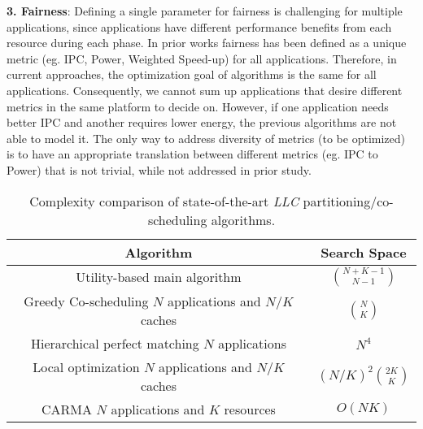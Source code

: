 \indent \textbf{3. Fairness}: Defining a single parameter for fairness is challenging for multiple applications, since applications have different performance benefits from each resource during each phase. In prior works fairness has been defined as a unique metric (eg. IPC, Power, Weighted Speed-up) for all applications. Therefore, in current approaches, the optimization goal of algorithms is the same for all applications. Consequently, we cannot sum up applications that desire different metrics in the same platform to decide on. However, if one application needs better IPC and another requires lower energy, the previous algorithms are not able to model it. The only way to address diversity of metrics (to be optimized) is to have an appropriate translation between different metrics (eg. IPC to Power) that is not trivial, while not addressed in prior study.\\
\begin{table}[!tb] %
\centering
\caption{\label{table:complexity} Complexity comparison of state-of-the-art \textit{LLC} partitioning/co-scheduling algorithms.}
\begin{tabular}{|c|c|} 
\hline Algorithm & Search Space\\
\hline Utility-based main algorithm \cite{qureshi2006utility} & $ \binom{N+K-1}{N-1}$  \\
\hline \pbox{20cm}{Greedy Co-scheduling \cite{jiang2008analysis}\\  $N$ applications and $N/K$ caches} & $ \binom{N}{K}  $ \\
\hline \pbox{20cm}{Hierarchical perfect matching \cite{jiang2008analysis} \\ $N$ applications} & $N^4 $ \\
\hline \pbox{20cm}{Local optimization \cite{jiang2008analysis} \\ $N$ applications and $N/K$ caches} & ${(N/K)}^2 \binom{2K}{K} $\\
\hline \pbox{20cm}{CARMA \\ $N$ applications and $K$ resources} & ${O(NK)}$\\
\hline
\end{tabular}
\vspace{-1\baselineskip}
\end{table}
\begin{comment}
\begin{figure}%
\centering
\texttt{[image: Images/Complexity.pdf]}
\caption{\label{fig:complexity} Complexity comparison of state-of-the-art \textit{LLC} partitioning algorithms.}
\end{figure}
\end{comment}
